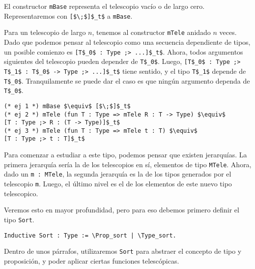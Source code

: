 El constructor \lstinline{mBase} representa el telescopio vacío o de largo cero. Representaremos con \lstinline{[$\;$]$_t$} a \lstinline{mBase}.

Para un telescopio de largo $n$, tenemos al constructor \lstinline{mTele} anidado $n$ veces. Dado que podemos pensar al telescopio como una secuencia dependiente de tipos, un posible comienzo es \lstinline{[T$_0$ : Type ;> ...]$_t$}. Ahora, todos argumentos siguientes del telescopio pueden depender de \lstinline{T$_0$}. Luego, \lstinline{[T$_0$ : Type ;> T$_1$ : T$_0$ -> Type ;> ...]$_t$} tiene sentido, y el tipo \lstinline{T$_1$} depende de \lstinline{T$_0$}. Tranquilamente se puede dar el caso es que ningún argumento dependa de \lstinline{T$_0$}.

\begin{lstlisting}[frame=tb,caption={Notación de telescopios},label=lst:not_tele]
(* ej 1 *) mBase $\equiv$ [$\;$]$_t$
(* ej 2 *) mTele (fun T : Type => mTele R : T -> Type) $\equiv$
[T : Type ;> R : (T -> Type)]$_t$
(* ej 3 *) mTele (fun T : Type => mTele t : T) $\equiv$
[T : Type ;> t : T]$_t$
\end{lstlisting}

Para comenzar a estudiar a este tipo, podemos pensar que existen jerarquías.
La primera jerarquía sería la de los telescopios en sí, elementos de tipo \lstinline{MTele}.
Ahora, dado un \lstinline{m : MTele}, la segunda jerarquía es la de los tipos generados por el telescopio \lstinline{m}.
Luego, el último nivel es el de los elementos de este nuevo tipo telescopico.

Veremos esto en mayor profundidad, pero para eso debemos primero definir el tipo \lstinline{Sort}.

\begin{lstlisting}[frame=tb,caption={Definición de \lstinline{Sort}},label=lst:Sort]
Inductive Sort : Type := \Prop_sort | \Type_sort.
\end{lstlisting}

Dentro de unos párrafos, utilizaremos \lstinline{Sort} para abstraer el concepto de tipo y proposición, y poder aplicar ciertas funciones telescópicas.


